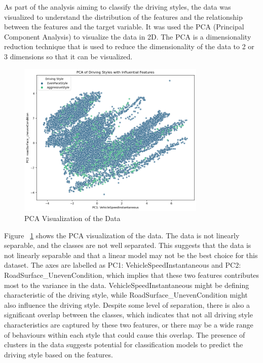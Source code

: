 As part of the analysis aiming to classify the driving styles, the data was visualized to understand the distribution of the features and the relationship between the features 
and the target variable. It was used the PCA (Principal Component Analysis) to visualize the data in 2D. The PCA is a dimensionality reduction technique that is used to reduce the
dimensionality of the data to 2 or 3 dimensions so that it can be visualized. 

\begin{figure}[H]
    \centering
    \includegraphics[width=0.8\textwidth]{images/pca_chart.png}
    \caption{PCA Visualization of the Data}
    \label{fig:pca}
\end{figure}

Figure ~\ref{fig:pca} shows the PCA visualization of the data. The data is not linearly separable, and the classes are not well separated. This suggests that the data is not
linearly separable and that a linear model may not be the best choice for this dataset.
The axes are labelled as PC1: VehicleSpeedInstantaneous and PC2: RoadSurface\_UnevenCondition, which implies that these two features contributes most to the variance in the data.
VehicleSpeedInstantaneous might be defining characteristic of the driving style, while RoadSurface\_UnevenCondition might also influence the driving style.
Despite some level of separation, there is also a significant overlap between the classes, which indicates that not all driving style characteristics are captured by these two features, or there
may be a wide range of behaviours  within each style that could cause this overlap.
The presence of clusters in the data suggests potential for classification models to predict the driving style based on the features.

